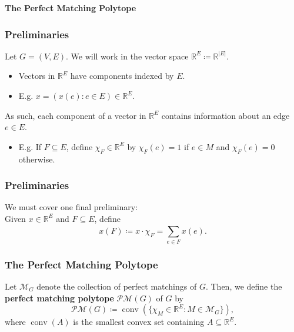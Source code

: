 
\begin{frame}
\begin{center}
\Large \textbf{The Perfect Matching Polytope} 
\end{center}
\end{frame}

\begin{frame}
\frametitle{Preliminaries}
Let \( G = (V,E) \). We will work in the vector space \( \mathbb{R}^{E} \coloneqq \mathbb{R}^{|E|}  \).\pause
\begin{itemize}
	\item Vectors in \( \mathbb{R}^{E}  \) have components indexed by \( E \).\pause
	\item E.g. \( x = (x(e) : e \in E) \in \mathbb{R}^{E} \). \pause
\end{itemize}
\vspace{0.3cm}
As such, each component of a vector in \( \mathbb{R}^{E}  \) contains information about an edge \( e \in E \). \pause
\begin{itemize}
	\item E.g. If \( F \subseteq E \), define \( \chi_{F} \in \mathbb{R}^{E}  \) by \( \chi_{F}(e) = 1  \) if \( e \in M \) and \( \chi_{F} (e) = 0 \) otherwise.
\end{itemize}
\vspace{0.3cm}
\end{frame}

\begin{frame}
\frametitle{Preliminaries}
We must cover one final preliminary:\pause \\
\vspace{0.3cm}
Given \( x \in \mathbb{R}^{E}  \) and \( F \subseteq E \), define \pause \[ x(F) \coloneqq x \cdot \chi_{F} = \sum_{e \in F}^{} x(e) .  \]
\end{frame}

\begin{frame}
\frametitle{The Perfect Matching Polytope}
Let \( \mathcal{M}_{G}  \) denote the collection of perfect matchings of \( G \). Then, we define the \textbf{perfect matching polytope} \( \mathcal{P} \mathcal{M}  (G) \) of \( G \) by \pause \[ \mathcal{P} \mathcal{M} (G) \coloneqq \operatorname{conv} (\{ \chi_{M} \in \mathbb{R}^{E} : M \in \mathcal{M} _{G}  \} ), \] \pause where \( \operatorname{conv} (A) \) is the smallest convex set containing \( A \subseteq \mathbb{R}^{E}  \).
\end{frame}

